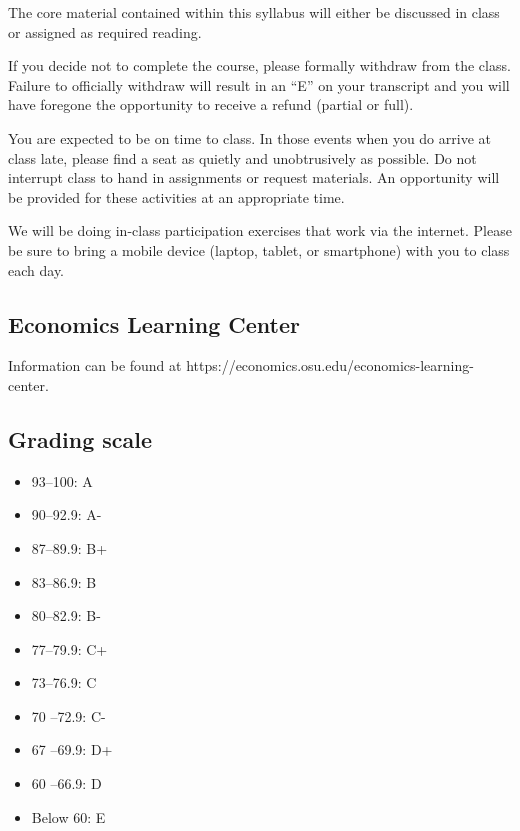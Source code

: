 \documentclass[12pt]{article}
\begin{document}
The core material contained within this syllabus will either be discussed in class or assigned as required reading.

If you decide not to complete the course, please formally withdraw from the class.
Failure to officially withdraw will result in an ``E'' on your transcript and you will have foregone the opportunity to receive a refund (partial or full).

You are expected to be on time to class.
In those events when you do arrive at class late, please find a seat as quietly and unobtrusively as possible.
Do not interrupt class to hand in assignments or request materials.
An opportunity will be provided for these activities at an appropriate time.

We will be doing in-class participation exercises that work via the internet.
Please be sure to bring a mobile device (laptop, tablet, or smartphone) with you to class each day.

\subsection*{Economics Learning Center}

Information can be found at https://economics.osu.edu/economics-learning-center.

\subsection*{Grading scale}
\begin{itemize}
    \item 93–100: A
    \item 90–92.9: A-
    \item 87–89.9: B+
    \item 83–86.9: B
    \item 80–82.9: B-
    \item 77–79.9: C+
    \item 73–76.9: C
    \item 70 –72.9: C-
    \item 67 –69.9: D+
    \item 60 –66.9: D
    \item Below 60: E
\end{itemize}








\printbibliography
\end{document}

